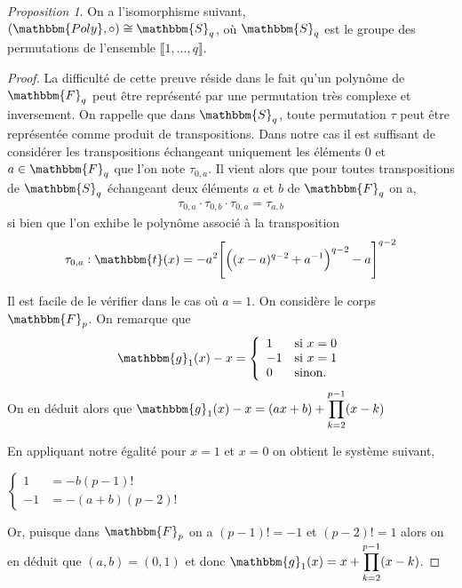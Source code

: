\documentclass[12pt]{article}
\theoremstyle{remark}\newtheorem{note}{Note}
\theoremstyle{remark}\newtheorem{nota}{Notation}
\newtheorem{prop}{Proposition}
\theoremstyle{definition}
\begin{document}
\begin{prop}
 On a l'isomorphisme suivant, $(\mathbbm{Poly}, \circ) \cong \mathbbm{S}_q$, où $\mathbbm{S}_q$ est le groupe des permutations de l'ensemble $\llbracket 1, ... , q \rrbracket$.
\end{prop}

\begin{proof}
La difficulté de cette preuve réside dans le fait qu'un polynôme de $\mathbbm{F}_q$ peut être représenté par une permutation très complexe et inversement. On rappelle que dans $\mathbbm{S}_q$, toute permutation $\tau$ peut être représentée comme produit de transpositions. Dans notre cas il est suffisant de considérer les transpositions échangeant uniquement les éléments $0$ et $a \in \mathbbm{F}_q$ que l'on note $\tau_{0,a}$. Il vient alors que pour toutes transpositions de $\mathbbm{S}_q$ échangeant deux éléments $a$ et $b$ de $\mathbbm{F}_q$ on a,
\begin{align*}
\tau_{0,a} \cdot \tau_{0,b} \cdot \tau_{0,a} = \tau_{a,b}
\end{align*}
si bien que l'on exhibe le polynôme associé à la transposition
\begin{align*}
\tau_{0,a} : \mathbbm{t} (x) = -a^2 \Bigg [ \Big ((x-a)^{q-2} + a^{-1} \Big )^{q-2} - a \Bigg ]^{q-2}
\end{align*}

Il est facile de le vérifier dans le cas où $a = 1$. On considère le corps $\mathbbm{F}_p$. On remarque que 
	$$
\mathbbm{g}_1 (x) - x = \left\{
    \begin{array}{ll}
        1 & \mbox{si } x = 0 \\
       -1 & \mbox{si } x = 1 \\
       0 & \mbox{sinon.}
    \end{array}
\right.
$$
On en déduit alors que $\displaystyle \mathbbm{g}_1  (x)- x = (ax + b) +  \prod_{k=2}^{p-1} (x-k)$

En appliquant notre égalité pour $x=1$ et $x=0$ on obtient le système suivant,
\begin{center}
$
\left\{
    \begin{array}{ll}
    	1 &= -b(p-1)!\\
    	-1 &= -(a+b)(p-2)!
    \end{array}
\right.
$
\end{center}
Or, puisque dans $\mathbbm{F}_p$ on a $(p-1)! = -1$ et $(p-2)! = 1$ alors on en déduit que $(a,b) = (0,1)$ et donc $\displaystyle \mathbbm{g}_1 (x) = x +  \prod_{k=2}^{p-1} (x-k)$.
\end{proof}
\end{document}
